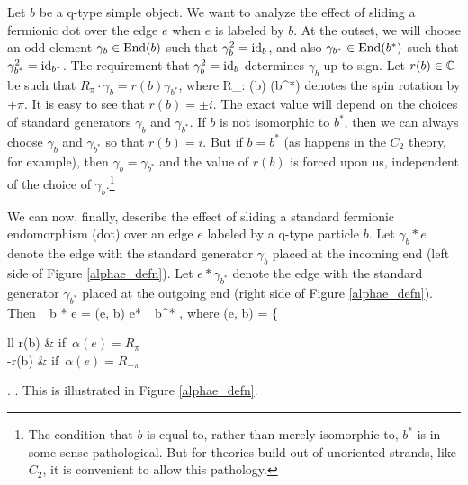 Let $b$ be a q-type simple object.
We want to analyze the effect of sliding a fermionic dot over the edge $e$ when $e$ is labeled by $b$.
At the outset, we will choose an odd element $\gamma_b\in\text{End}(b)$ such that $\gamma_b^2 = \text{id}_b$, and also
$\gamma_{b^*}\in\text{End}(b^*)$ such that $\gamma_{b^*}^2 = \text{id}_{b^*}$.
The requirement that $\gamma_b^2 = \text{id}_b$ determines $\gamma_b$ up to sign.
Let $r(b)\in\mathbb{C}$ be such that $R_\pi\cdot\gamma_b = r(b)\gamma_{b^*}$, where
\be
	R_\pi : \End(b) \to \End(b^*)
\ee
denotes the spin rotation by $+\pi$.
It is easy to see that $r(b) = \pm i$.
The exact value will depend on the choices of standard generators $\gamma_b$ and $\gamma_{b^*}$.
If $b$ is not isomorphic to $b^*$, then we can always choose $\gamma_b$ and $\gamma_{b^*}$ so that $r(b) = i$.
But if $b = b^*$ (as happens in the $C_2$ theory, for example), then $\gamma_b = \gamma_{b^*}$ and the value of $r(b)$
is forced upon us, independent of the choice of $\gamma_b$.\footnote{
The condition that $b$ is equal to, rather than merely isomorphic to, $b^*$ is in some sense pathological.
But for theories build out of unoriented strands, like $C_2$, it is convenient to allow this pathology.}

We can now, finally, describe the effect of sliding a standard fermionic endomorphism (dot) over an edge $e$ labeled by 
a q-type particle $b$.
Let $\gamma_b * e$ denote the edge with the standard generator $\gamma_b$ placed at the incoming end (left side of Figure \ref{alphae_defn}).
Let $e* \gamma_{b^*}$ denote the edge with the standard generator $\gamma_{b^*}$ placed at the outgoing end (right side of Figure \ref{alphae_defn}).
Then
\be
	\gamma_b * e = \alpha(e, b) \cdot e* \gamma_{b^*} ,
	\label{fermion_slide}
\ee
where
\be
	\alpha(e, b) =  \left\{   \begin{array}{ll}  
		r(b) & \mbox{if $\alpha(e) = R_\pi$} \\
		-r(b) & \mbox{if $\alpha(e) = R_{-\pi}$} \\
	\end{array}  \right. .
\ee
This is illustrated in Figure \ref{alphae_defn}.

